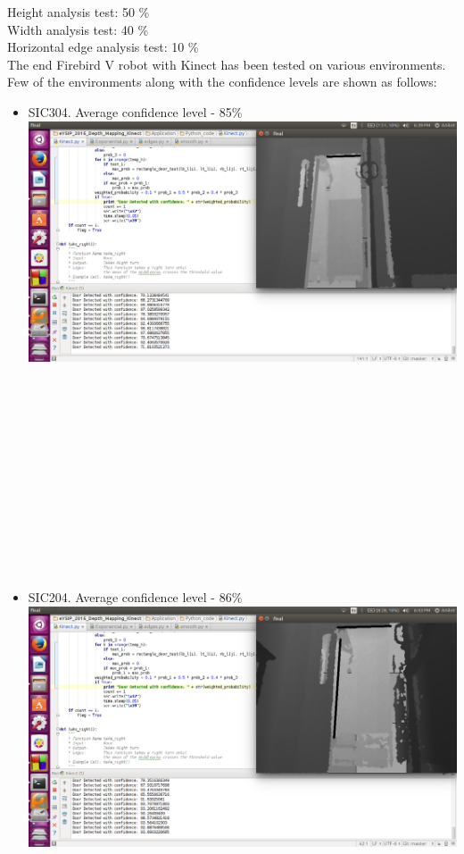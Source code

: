 \documentclass{report}
\begin{document}
Height analysis test: 50 \% \\
Width analysis test: 40 \% \\
Horizontal edge analysis test: 10 \% \\
The end Firebird V robot with Kinect has been tested on various environments. Few of the environments along with the confidence levels are shown as follows:
\begin{itemize}
 \item SIC304. Average confidence level - 85\% \\
 \includegraphics[width = 15cm]{confidence_304.png} \\ \\ \\ \\ \\ \\ \\ \\ \\ \\ \\ \\ \\
 \item SIC204. Average confidence level - 86\% \\ 
 \includegraphics[width = 15cm]{confidence_204.png} \\

\end{itemize}
\end{document}
